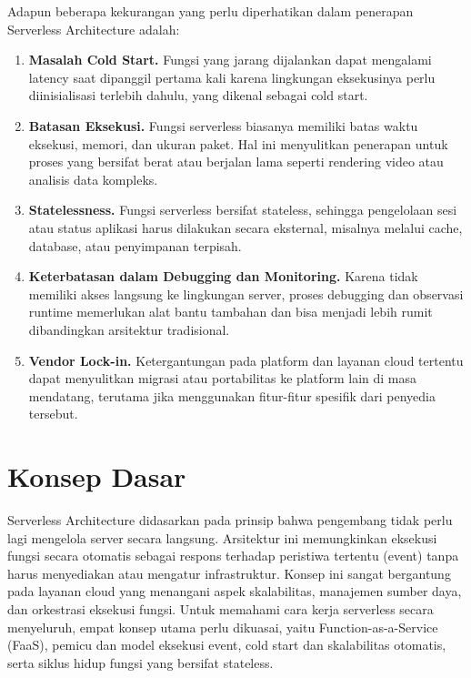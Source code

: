 Adapun beberapa kekurangan yang perlu diperhatikan dalam penerapan Serverless Architecture adalah:
\begin{enumerate}
	\item \textbf{Masalah Cold Start.} Fungsi yang jarang dijalankan dapat mengalami latency saat dipanggil pertama kali karena lingkungan eksekusinya perlu diinisialisasi terlebih dahulu, yang dikenal sebagai cold start.
	
	\item \textbf{Batasan Eksekusi.} Fungsi serverless biasanya memiliki batas waktu eksekusi, memori, dan ukuran paket. Hal ini menyulitkan penerapan untuk proses yang bersifat berat atau berjalan lama seperti rendering video atau analisis data kompleks.
	
	\item \textbf{Statelessness.} Fungsi serverless bersifat stateless, sehingga pengelolaan sesi atau status aplikasi harus dilakukan secara eksternal, misalnya melalui cache, database, atau penyimpanan terpisah.
	
	\item \textbf{Keterbatasan dalam Debugging dan Monitoring.} Karena tidak memiliki akses langsung ke lingkungan server, proses debugging dan observasi runtime memerlukan alat bantu tambahan dan bisa menjadi lebih rumit dibandingkan arsitektur tradisional.
	
	\item \textbf{Vendor Lock-in.} Ketergantungan pada platform dan layanan cloud tertentu dapat menyulitkan migrasi atau portabilitas ke platform lain di masa mendatang, terutama jika menggunakan fitur-fitur spesifik dari penyedia tersebut.
\end{enumerate}



\section{Konsep Dasar}

Serverless Architecture didasarkan pada prinsip bahwa pengembang tidak perlu lagi mengelola server secara langsung. Arsitektur ini memungkinkan eksekusi fungsi secara otomatis sebagai respons terhadap peristiwa tertentu (event) tanpa harus menyediakan atau mengatur infrastruktur. Konsep ini sangat bergantung pada layanan cloud yang menangani aspek skalabilitas, manajemen sumber daya, dan orkestrasi eksekusi fungsi. Untuk memahami cara kerja serverless secara menyeluruh, empat konsep utama perlu dikuasai, yaitu Function-as-a-Service (FaaS), pemicu dan model eksekusi event, cold start dan skalabilitas otomatis, serta siklus hidup fungsi yang bersifat stateless.

